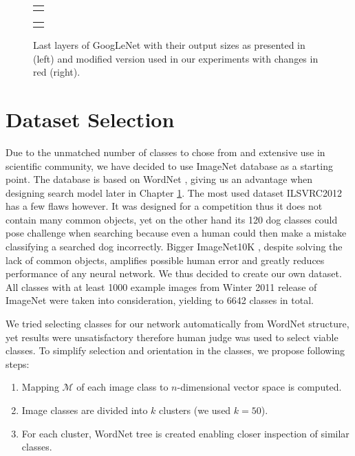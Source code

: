 \begin{figure}
	\centering
	
	\begin{tabular}{@{}c@{}}
		\subfloat{
			
		}
	\end{tabular}
	\begin{tabular}{@{}c@{}}
		\subfloat{
			
		}
	\end{tabular}
	
	\caption[Last layers of GoogLeNet]{Last layers of GoogLeNet with their output sizes as presented in \cite{szegedy2015going} (left) and modified version used in our experiments with changes in red (right).}
	\label{fig:inception_end}
\end{figure}



\section{Dataset Selection}
Due to the unmatched number of classes to chose from and extensive use in scientific community, we have decided to use ImageNet database \cite{ILSVRC15} as a starting point. The database is based on WordNet \cite{WordNet}, giving us an advantage when designing search model later in Chapter \ref{}. The most used dataset ILSVRC2012 has a few flaws however. It was designed for a competition thus it does not contain many common objects, yet on the other hand its 120 dog classes could pose challenge when searching because even a human could then make a mistake classifying a searched dog incorrectly. Bigger ImageNet10K \cite{deng2010does}, despite solving the lack of common objects, amplifies possible human error and greatly reduces performance of any neural network. We thus decided to create our own dataset. All classes with at least 1000 example images from Winter 2011 release of ImageNet were taken into consideration, yielding to 6642 classes in total.

We tried selecting classes for our network automatically from WordNet structure, yet results were unsatisfactory therefore human judge was used to select viable classes. To simplify selection and orientation in the classes, we propose following steps:
\begin{enumerate}
	\item Mapping $\mathcal{M}$ of each image class to $n$-dimensional vector space is computed.
	\item Image classes are divided into $k$ clusters (we used $k=50$).
	\item For each cluster, WordNet tree is created enabling closer inspection of similar classes.
\end{enumerate}

